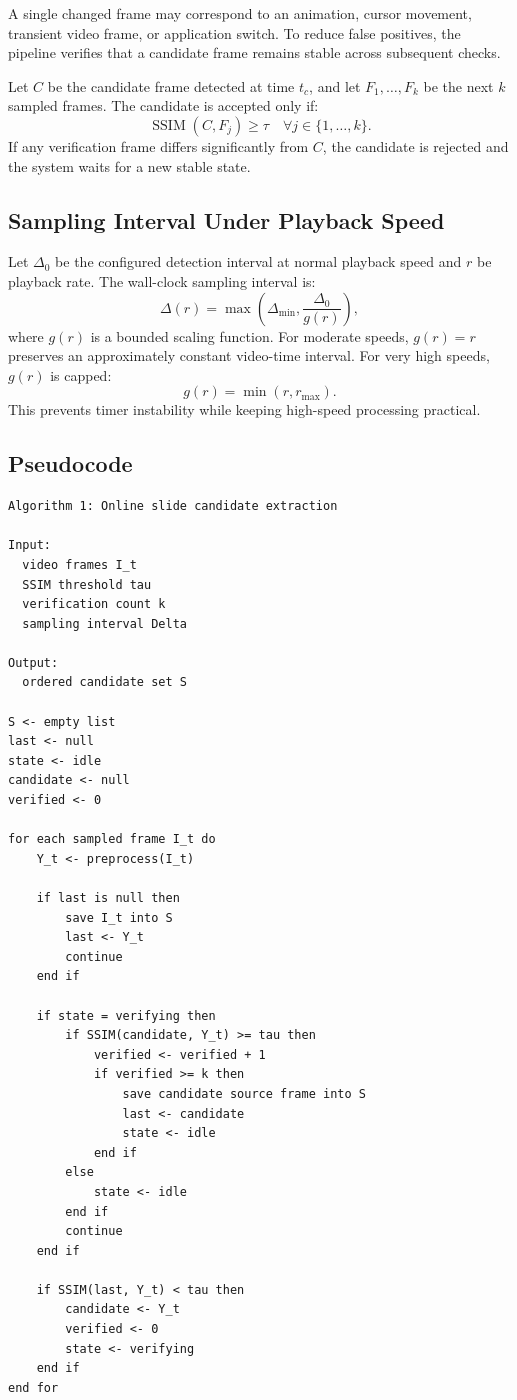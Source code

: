 \documentclass[11pt]{article}
\begin{document}
A single changed frame may correspond to an animation, cursor movement, transient video frame, or application switch. To reduce false positives, the pipeline verifies that a candidate frame remains stable across subsequent checks.

Let $C$ be the candidate frame detected at time $t_c$, and let $F_1,\ldots,F_k$ be the next $k$ sampled frames. The candidate is accepted only if:
\[
\operatorname{SSIM}(C,F_j) \ge \tau
\quad \forall j \in \{1,\ldots,k\}.
\]
If any verification frame differs significantly from $C$, the candidate is rejected and the system waits for a new stable state.

\subsection{Sampling Interval Under Playback Speed}

Let $\Delta_0$ be the configured detection interval at normal playback speed and $r$ be playback rate. The wall-clock sampling interval is:
\[
\Delta(r)=\max\left(\Delta_{\min}, \frac{\Delta_0}{g(r)}\right),
\]
where $g(r)$ is a bounded scaling function. For moderate speeds, $g(r)=r$ preserves an approximately constant video-time interval. For very high speeds, $g(r)$ is capped:
\[
g(r)=\min(r,r_{\max}).
\]
This prevents timer instability while keeping high-speed processing practical.

\subsection{Pseudocode}

\begin{verbatim}
Algorithm 1: Online slide candidate extraction

Input:
  video frames I_t
  SSIM threshold tau
  verification count k
  sampling interval Delta

Output:
  ordered candidate set S

S <- empty list
last <- null
state <- idle
candidate <- null
verified <- 0

for each sampled frame I_t do
    Y_t <- preprocess(I_t)

    if last is null then
        save I_t into S
        last <- Y_t
        continue
    end if

    if state = verifying then
        if SSIM(candidate, Y_t) >= tau then
            verified <- verified + 1
            if verified >= k then
                save candidate source frame into S
                last <- candidate
                state <- idle
            end if
        else
            state <- idle
        end if
        continue
    end if

    if SSIM(last, Y_t) < tau then
        candidate <- Y_t
        verified <- 0
        state <- verifying
    end if
end for
\end{verbatim}
\end{document}
